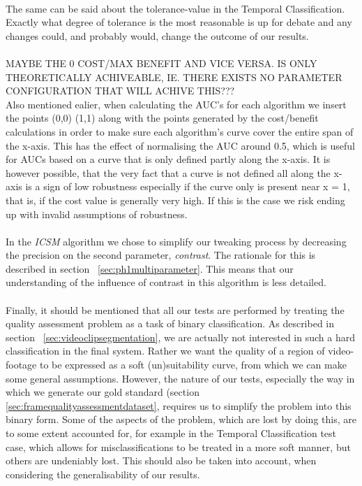 \\
The same can be said about the tolerance-value in the Temporal Classification. Exactly what degree of tolerance is the most reasonable is up for debate and any changes could, and probably would, change the outcome of our results.\\
\\
MAYBE THE 0 COST/MAX BENEFIT AND VICE VERSA. IS ONLY THEORETICALLY ACHIVEABLE, IE. THERE EXISTS NO PARAMETER CONFIGURATION THAT WILL ACHIVE THIS???\\
Also mentioned ealier, when calculating the AUC's for each algorithm we insert the points (0,0) (1,1) along with the points generated by the cost/benefit calculations in order to make sure each algorithm's curve cover the entire span of the x-axis. This has the effect of normalising the AUC around 0.5, which is useful for AUCs based on a curve that is only defined partly along the x-axis. It is however possible, that the very fact that a curve is not defined all along the x-axis is a sign of low robustness especially if the curve only is present near x = 1, that is, if the cost value is generally very high. If this is the case we risk ending up with invalid assumptions of robustness.\\
\\
In the \textit{ICSM} algorithm we chose to simplify our tweaking process by decreasing the precision on the second parameter, \textit{contrast}. The rationale for this is described in section~ \ref{sec:ph1multiparameter}. This means that our understanding of the influence of contrast in this algorithm is less detailed.\\
\\
Finally, it should be mentioned that all our tests are performed by treating the quality assessment problem as a task of binary classification. As described in section~ \ref{sec:videoclipsegmentation}, we are actually not interested in such a hard classification in the final system. Rather we want the quality of a region of video-footage to be expressed as a soft (un)suitability curve, from which we can make some general assumptions. However, the nature of our tests, especially the way in which we generate our gold standard (section~ \ref{sec:framequalityassessmentdataset}, requires us to simplify the problem into this binary form. Some of the aspects of the problem, which are lost by doing this, are to some extent accounted for, for example in the Temporal Classification test case, which allows for misclassifications to be treated in a more soft manner, but others are undeniably lost. This should also be taken into account, when considering the generalisability of our results.
%
